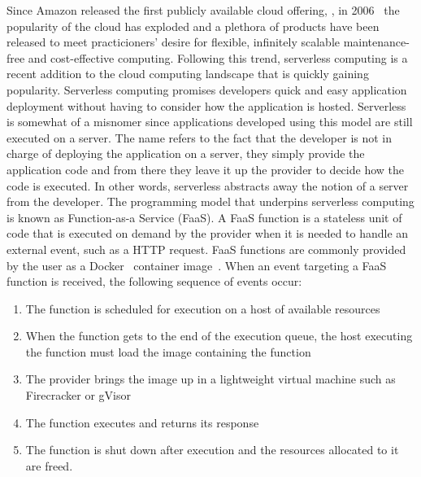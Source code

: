 \documentclass[../main.tex]{subfiles}
\begin{document}
\begin{refsection}
Since Amazon released the first publicly available cloud offering,
, in 2006~\cite{qian2009cloud} the popularity of
the cloud has exploded and a plethora of products have been released
to meet practicioners' desire for flexible, infinitely scalable
maintenance-free and cost-effective computing. Following this trend,
serverless computing is a recent addition to the cloud computing
landscape that is quickly gaining popularity. Serverless computing
promises developers quick and easy application deployment without
having to consider how the application is hosted. Serverless is
somewhat of a misnomer since applications developed using this model
are still executed on a server. The name refers to the fact that the
developer is not in charge of deploying the application on a server,
they simply provide the application code and from there they leave it
up the provider to decide how the code is executed. In other words,
serverless abstracts away the notion of a server from the
developer. The programming model that underpins serverless computing
is known as Function-as-a Service (FaaS). A FaaS function is a
stateless unit of code that is executed on demand by the provider when
it is needed to handle an external event, such as a HTTP request. FaaS
functions are commonly provided by the user as a Docker~\cite{docker}
container image~\cite{serverless_state}. When an event targeting a
FaaS function is received, the following sequence of events occur:
\begin{enumerate}
\item The function is scheduled for execution on a host of available resources
\item When the function gets to the end of the execution queue, the host executing the function must load the image containing the function
\item The provider brings the image up in a lightweight virtual machine such as Firecracker or gVisor
\item The function executes and returns its response
\item The function is shut down after execution and the resources
  allocated to it are freed.
\end{enumerate}



\end{refsection}
\end{document}
